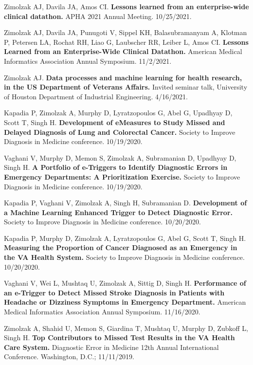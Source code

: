 \documentclass[10pt]{article}
\begin{document}
Zimolzak AJ, Davila JA, Amos CI. \textbf{Lessons learned from an
  enterprise-wide clinical datathon.} APHA 2021 Annual Meeting.
10/25/2021.

Zimolzak AJ, Davila JA, Punugoti V, Sippel KH, Balasubramanyam A,
Klotman P, Petersen LA, Rochat RH, Liao G, Laubscher RR, Leiber L,
Amos CI. \textbf{Lessons Learned from an Enterprise-Wide Clinical
  Datathon.} American Medical Informatics Association Annual
Symposium. 11/2/2021.

Zimolzak AJ. \textbf{Data processes and machine learning for health
  research, in the US Department of Veterans Affairs.} Invited seminar
talk, University of Houston Department of Industrial Engineering.
4/16/2021.


Kapadia P, Zimolzak A, Murphy D, Lyratzopoulos G, Abel G, Upadhyay D,
Scott T, Singh H. \textbf{Development of eMeasures to Study Missed and
  Delayed Diagnosis of Lung and Colorectal Cancer.} Society to Improve
Diagnosis in Medicine conference. 10/19/2020.

Vaghani V, Murphy D, Memon S, Zimolzak A, Subramanian D, Upadhyay D,
Singh H. \textbf{A Portfolio of e-Triggers to Identify Diagnostic
  Errors in Emergency Departments: A Prioritization Exercise.} Society
to Improve Diagnosis in Medicine conference. 10/19/2020.

Kapadia P, Vaghani V, Zimolzak A, Singh H, Subramanian D.
\textbf{Development of a Machine Learning Enhanced Trigger to Detect
  Diagnostic Error.} Society to Improve Diagnosis in Medicine
conference. 10/20/2020.

Kapadia P, Murphy D, Zimolzak A, Lyratzopoulos G, Abel G, Scott T,
Singh H. \textbf{Measuring the Proportion of Cancer Diagnosed as an
  Emergency in the VA Health System.} Society to Improve Diagnosis in
Medicine conference. 10/20/2020.


Vaghani V, Wei L, Mushtaq U, Zimolzak A, Sittig D, Singh H.
\textbf{Performance of an e-Trigger to Detect Missed Stroke Diagnosis
  in Patients with Headache or Dizziness Symptoms in Emergency
  Department.} American Medical Informatics
Association Annual Symposium. 11/16/2020.


Zimolzak A, Shahid U, Memon S, Giardina T, Mushtaq U, Murphy D,
Zubkoff L, Singh H. \textbf{Top Contributors to Missed Test Results in
  the VA Health Care System.} Diagnostic Error in Medicine 12th Annual
International Conference. Washington, D.C.; 11/11/2019.
\end{document}
